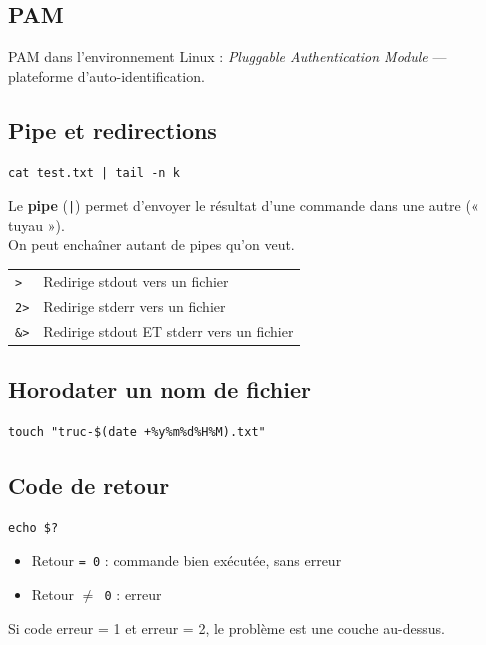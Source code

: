 \documentclass[a4paper,12pt]{article}
\begin{document}
\subsection{PAM}

PAM dans l'environnement Linux : \textit{Pluggable Authentication Module} — plateforme d'auto-identification.

\subsection{Pipe et redirections}

\begin{lstlisting}
cat test.txt | tail -n k
\end{lstlisting}
Le \textbf{pipe} (\texttt{|}) permet d'envoyer le résultat d'une commande dans une autre (« tuyau »).\\
On peut enchaîner autant de pipes qu'on veut.

\medskip
\begin{tabular}{ll}
    \texttt{>}  & Redirige stdout vers un fichier \\
    \texttt{2>} & Redirige stderr vers un fichier \\
    \texttt{\&>} & Redirige stdout ET stderr vers un fichier \\
\end{tabular}

\subsection{Horodater un nom de fichier}

\begin{lstlisting}
touch "truc-$(date +%y%m%d%H%M).txt"
\end{lstlisting}

\subsection{Code de retour}

\begin{lstlisting}
echo $?
\end{lstlisting}
\begin{itemize}
    \item Retour \texttt{= 0} : commande bien exécutée, sans erreur
    \item Retour \texttt{$\neq$ 0} : erreur
\end{itemize}

Si code erreur = 1 et erreur = 2, le problème est une couche au-dessus.
\end{document}
